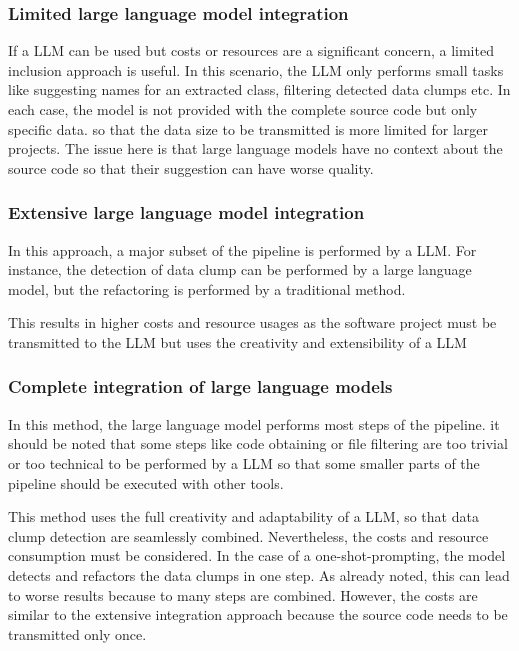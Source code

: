 \subsubsection{Limited large language model integration}

If a \ac{LLM} can be used but costs or resources are a significant concern, a limited inclusion approach is useful. In this scenario, the \ac{LLM} only performs small tasks like suggesting names for an extracted class, filtering detected data clumps etc. In each case, the model is not provided with the  complete source code but only specific data. so that the data size to be transmitted is more limited for larger projects. The issue here is that large language models have no context about the source code so that their suggestion can have worse quality. 

\subsubsection{Extensive large language model integration }

In this approach, a major subset of the pipeline is performed by a \ac{LLM}. For instance, the detection of data clump can be performed by a large language model, but the refactoring is performed by a traditional method. 

This results in higher costs and resource usages as the software project must be transmitted to the \ac{LLM} but uses the creativity and extensibility of a \ac{LLM}

\subsubsection{Complete integration of large language models}

In this method, the large language model performs most steps of the pipeline. it should be noted that some steps like code obtaining or file filtering are too trivial or too technical to be performed by a \ac{LLM} so that some smaller parts of the pipeline should be executed with other tools. 

This method uses the full creativity and adaptability of a \ac{LLM}, so that data clump detection are seamlessly combined. Nevertheless, the costs and resource consumption must be considered. In the case of a one-shot-prompting, the model detects and refactors the data clumps in one step. As already noted, this can lead to worse results because to many steps are combined. However, the costs are similar to the  extensive integration approach because the source code needs to be transmitted only once. 

